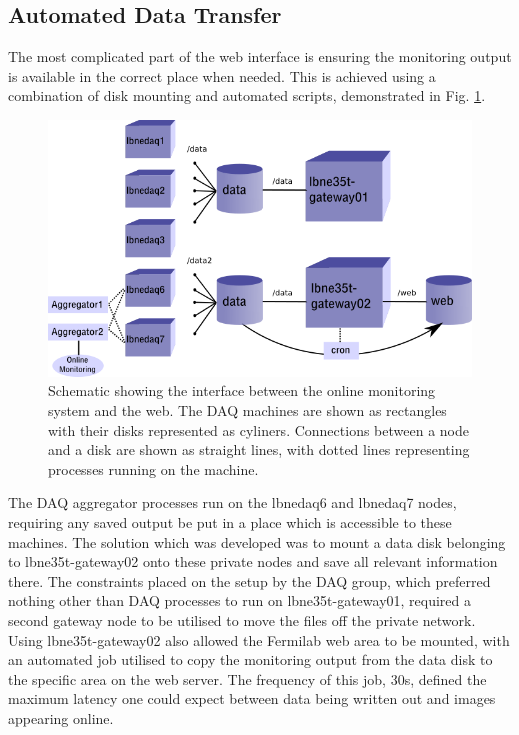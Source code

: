 \subsection{Automated Data Transfer}\label{sec:AutomatedDataTransfer}

The most complicated part of the web interface is ensuring the monitoring output is available in the correct place when needed.  This is achieved using a combination of disk mounting and automated scripts, demonstrated in Fig. \ref{fig:WebInterface}.

\begin{figure}[ht]
  \centering
  \includegraphics[width=12cm]{webInterface.png}
  \caption[Schematic showing the interface between the online monitoring system and the web]{Schematic showing the interface between the online monitoring system and the web.  The DAQ machines are shown as rectangles with their disks represented as cyliners.  Connections between a node and a disk are shown as straight lines, with dotted lines representing processes running on the machine.}
  \label{fig:WebInterface}
\end{figure}

The DAQ aggregator processes run on the lbnedaq6 and lbnedaq7 nodes, requiring any saved output be put in a place which is accessible to these machines.  The solution which was developed was to mount a data disk belonging to lbne35t-gateway02 onto these private nodes and save all relevant information there.  The constraints placed on the setup by the DAQ group, which preferred nothing other than DAQ processes to run on lbne35t-gateway01, required a second gateway node to be utilised to move the files off the private network.  Using lbne35t-gateway02 also allowed the Fermilab web area to be mounted, with an automated job utilised to copy the monitoring output from the data disk to the specific area on the web server.  The frequency of this job, 30s, defined the maximum latency one could expect between data being written out and images appearing online.


